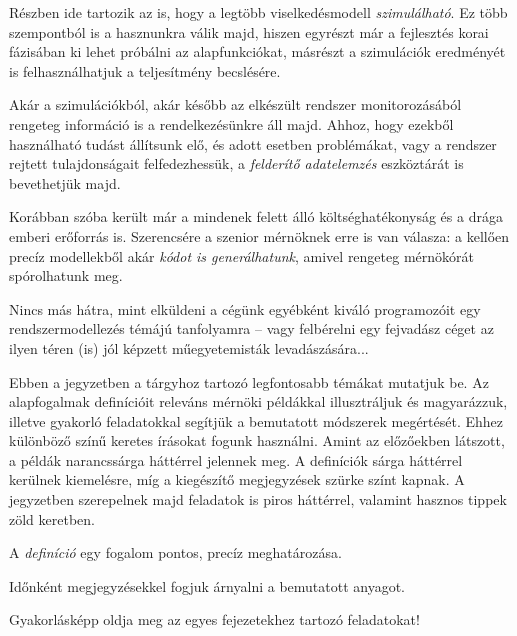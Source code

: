 \begin{pelda}
	Részben ide tartozik az is, hogy a legtöbb viselkedésmodell \emph{szimulálható}. Ez több szempontból is a hasznunkra válik majd, hiszen egyrészt már a fejlesztés korai fázisában ki lehet próbálni az alapfunkciókat, másrészt a szimulációk eredményét is felhasználhatjuk a teljesítmény becslésére.
	
	Akár a szimulációkból, akár később az elkészült rendszer monitorozásából rengeteg információ is a rendelkezésünkre áll majd. Ahhoz, hogy ezekből használható tudást állítsunk elő, és adott esetben problémákat, vagy a rendszer rejtett tulajdonságait felfedezhessük, a \emph{felderítő adatelemzés} eszköztárát is bevethetjük majd.
	
	Korábban szóba került már a mindenek felett álló költséghatékonyság és a drága emberi erőforrás is. Szerencsére a szenior mérnöknek erre is van válasza: a kellően precíz modellekből akár \emph{kódot is generálhatunk}, amivel rengeteg mérnökórát spórolhatunk meg.
	
	Nincs más hátra, mint elküldeni a cégünk egyébként kiváló programozóit egy rendszermodellezés témájú tanfolyamra -- vagy felbérelni egy fejvadász céget az ilyen téren (is) jól képzett műegyetemisták levadászására...
\end{pelda}

Ebben a jegyzetben a tárgyhoz tartozó legfontosabb témákat mutatjuk be. Az alapfogalmak definícióit releváns mérnöki példákkal illusztráljuk és magyarázzuk, illetve gyakorló feladatokkal segítjük a bemutatott módszerek megértését.
Ehhez különböző színű keretes írásokat fogunk használni. Amint az előzőekben látszott, a példák narancssárga háttérrel jelennek meg. A definíciók sárga háttérrel kerülnek kiemelésre, míg a kiegészítő megjegyzések szürke színt kapnak. A jegyzetben szerepelnek majd feladatok is piros háttérrel, valamint hasznos tippek zöld keretben.

\begin{definicio}
	A \emph{definíció} egy fogalom pontos, precíz meghatározása.
\end{definicio}

\begin{megjegyzes}
	Időnként megjegyzésekkel fogjuk árnyalni a bemutatott anyagot.
\end{megjegyzes}

\begin{feladat}
	Gyakorlásképp oldja meg az egyes fejezetekhez tartozó feladatokat!
\end{feladat}

